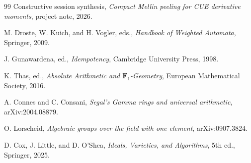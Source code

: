 \documentclass[11pt]{article}
\theoremstyle{plain}
\theoremstyle{definition}
\begin{document}
\begin{thebibliography}{99}
Constructive session synthesis,
\emph{Compact Mellin peeling for CUE derivative moments}, project note, 2026.

M. Droste, W. Kuich, and H. Vogler, eds.,
\emph{Handbook of Weighted Automata}, Springer, 2009.

J. Gunawardena, ed.,
\emph{Idempotency}, Cambridge University Press, 1998.

K. Thas, ed.,
\emph{Absolute Arithmetic and \(\mathbf F_1\)-Geometry}, European Mathematical Society, 2016.

A. Connes and C. Consani,
\emph{Segal's Gamma rings and universal arithmetic}, arXiv:2004.08879.

O. Lorscheid,
\emph{Algebraic groups over the field with one element}, arXiv:0907.3824.

D. Cox, J. Little, and D. O'Shea,
\emph{Ideals, Varieties, and Algorithms}, 5th ed., Springer, 2025.

\end{thebibliography}
\end{document}
